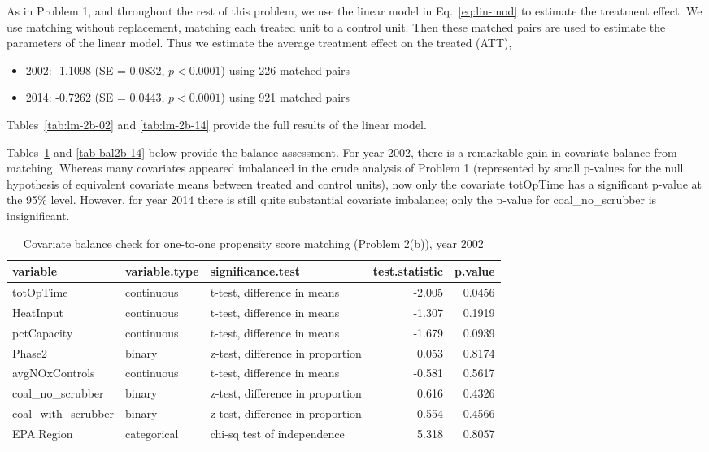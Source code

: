 \begin{enumerate}[(a)]
  As in Problem 1, and throughout the rest of this problem, we use the
  linear model in Eq.~\eqref{eq:lin-mod} to estimate the treatment
  effect.  We use matching without replacement, matching each treated
  unit to a control unit.  Then these matched pairs are used to
  estimate the parameters of the linear model.  Thus we estimate the
  average treatment effect on the treated (ATT), 
  \begin{itemize}
  \item 2002: -1.1098 (SE = 0.0832, $p < 0.0001$) using 226 matched
    pairs
  \item 2014: -0.7262 (SE = 0.0443, $p < 0.0001$) using 921 matched
    pairs
  \end{itemize}
  Tables~\ref{tab:lm-2b-02} and \ref{tab:lm-2b-14} provide the full
  results of the linear model.

  Tables~\ref{tab-bal2b-02} and \ref{tab-bal2b-14} below provide the
  balance assessment.  For year 2002, there is a remarkable gain in
  covariate balance from matching.  Whereas many covariates appeared
  imbalanced in the crude analysis of Problem 1 (represented by small
  p-values for the null hypothesis of equivalent covariate means
  between treated and control units), now only the covariate totOpTime
  has a significant p-value at the 95\% level.  However, for year 2014
  there is still quite substantial covariate imbalance; only the
  p-value for coal\_no\_scrubber is insignificant.

  

  \begin{table}[ht]
    \centering
    \begin{tabular}{lllrr}
      \toprule
      variable & variable.type & significance.test & test.statistic & p.value \\ 
      \midrule
      totOpTime & continuous & t-test, difference in means & -2.005 & 0.0456 \\ 
      HeatInput & continuous & t-test, difference in means & -1.307 & 0.1919 \\ 
      pctCapacity & continuous & t-test, difference in means & -1.679 & 0.0939 \\ 
      Phase2 & binary & z-test, difference in proportion & 0.053 & 0.8174 \\ 
      avgNOxControls & continuous & t-test, difference in means & -0.581 & 0.5617 \\ 
      coal\_no\_scrubber & binary & z-test, difference in proportion & 0.616 & 0.4326 \\ 
      coal\_with\_scrubber & binary & z-test, difference in proportion & 0.554 & 0.4566 \\ 
      EPA.Region & categorical & chi-sq test of independence & 5.318 & 0.8057 \\ 
      \bottomrule
    \end{tabular}
    \caption{Covariate balance check for one-to-one propensity score matching (Problem 2(b)), year 2002} 
    \label{tab-bal2b-02}
  \end{table}


\end{enumerate}
